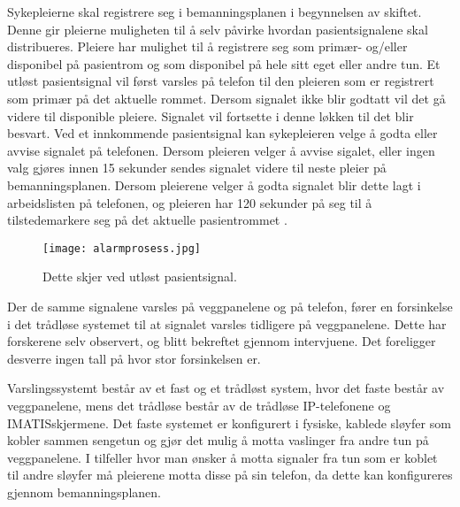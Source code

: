 \noindent
Sykepleierne skal registrere seg i bemanningsplanen i begynnelsen av skiftet. Denne gir pleierne muligheten til å selv påvirke hvordan pasientsignalene skal distribueres. Pleiere har mulighet til å registrere seg som primær- og/eller disponibel på pasientrom og som disponibel på hele sitt eget eller andre tun. Et utløst pasientsignal vil først varsles på telefon til den pleieren som er registrert som primær på det aktuelle rommet. Dersom signalet ikke blir godtatt vil det gå videre til disponible pleiere. Signalet vil fortsette i denne løkken til det blir besvart.
Ved et innkommende pasientsignal kan sykepleieren velge å godta eller avvise signalet på telefonen. Dersom pleieren velger å avvise sigalet, eller ingen valg gjøres innen 15 sekunder sendes signalet videre til neste pleier på bemanningsplanen. Dersom pleierene velger å godta signalet blir dette lagt i arbeidslisten på telefonen, og pleieren har 120 sekunder på seg til å tilstedemarkere seg på det aktuelle pasientrommet \citep{BrukermanualforPasientsignalogPasientsignalapplikasjon}.

\begin{figure}[H]
\centering
\texttt{[image: alarmprosess.jpg]}
\caption{Dette skjer ved utløst pasientsignal.}
\label{fig:detteskjer}
\end{figure}

\noindent
Der de samme signalene varsles på veggpanelene og på telefon, fører en forsinkelse i det trådløse systemet til at signalet varsles tidligere på veggpanelene. Dette har forskerene selv observert, og blitt bekreftet gjennom intervjuene. Det foreligger desverre ingen tall på hvor stor forsinkelsen er. 

\noindent
Varslingssystemt består av et fast og et trådløst system, hvor det faste består av veggpanelene, mens det trådløse består av de trådløse IP-telefonene og IMATISskjermene. Det faste systemet er konfigurert i fysiske, kablede sløyfer som kobler sammen sengetun og gjør det mulig å motta vaslinger fra andre tun på veggpanelene. I tilfeller hvor man ønsker å motta signaler fra tun som er koblet til andre sløyfer må pleierene motta disse på sin telefon, da dette kan konfigureres gjennom bemanningsplanen.